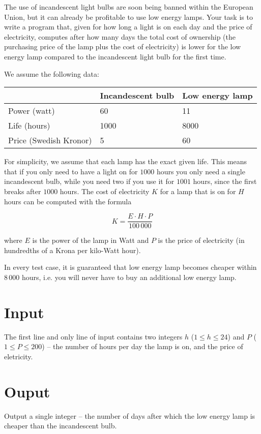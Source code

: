 The use of incandescent light bulbs are soon being banned within the European Union, but it can already be profitable to use low energy lamps.
Your task is to write a program that, given for how long a light is on each day and the price of electricity, computes after how many days the total cost of ownership (the purchasing price of the lamp plus the cost of electricity) is lower for the low energy lamp compared to the incandescent light bulb for the first time.

We assume the following data:

\noindent
\begin{tabular}{|l|l|l|}
\hline
& Incandescent bulb & Low energy lamp \\ \hline
Power (watt)           & 60                & 11             \\ \hline
Life (hours)           & 1000              & 8000           \\ \hline
Price (Swedish Kronor) & 5                 & 60             \\ \hline
\end{tabular}

For simplicity, we assume that each lamp has the exact given life.
This means that if you only need to have a light on for $1000$ hours you only need a single incandescent bulb, while you need two if you use it for $1001$ hours, since the first breaks after $1000$ hours.
The cost of electricity $K$ for a lamp that is on for $H$ hours can be computed with the formula

$$ K = \frac{E \cdot H \cdot P}{100\,000} $$

where $E$ is the power of the lamp in Watt and $P$ is the price of electricity (in hundredths of a Krona per kilo-Watt hour).

In every test case, it is guaranteed that low energy lamp becomes cheaper within $8\,000$ hours, i.e. you will never have to buy an additional low energy lamp.

\section*{Input}
The first line and only line of input contains two integers $h$ ($1 \le h \le 24$) and $P$ ($1 \le P \le 200$) -- the number of hours per day the lamp is on, and the price of eletricity.

\section*{Ouput}
Output a single integer -- the number of days after which the low energy lamp is cheaper than the incandescent bulb.

